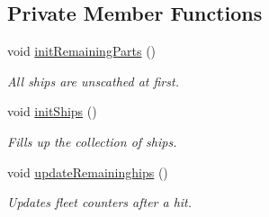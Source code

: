 \subsection*{Private Member Functions}
\begin{DoxyCompactItemize}
\item 
void \hyperlink{classbattleship2D_1_1model_1_1Fleet_aed5a2244dee690f2640cc8d1960f0669}{init\-Remaining\-Parts} ()
\begin{DoxyCompactList}\small\item\em All ships are unscathed at first. \end{DoxyCompactList}\item 
void \hyperlink{classbattleship2D_1_1model_1_1Fleet_a554aa032fe5ad3811effe0acf8c47c18}{init\-Ships} ()
\begin{DoxyCompactList}\small\item\em Fills up the collection of ships. \end{DoxyCompactList}\item 
void \hyperlink{classbattleship2D_1_1model_1_1Fleet_a69efdd7a9a1fe25892d057f0f31c912f}{update\-Remaininghips} ()
\begin{DoxyCompactList}\small\item\em Updates fleet counters after a hit. \end{DoxyCompactList}\end{DoxyCompactItemize}
